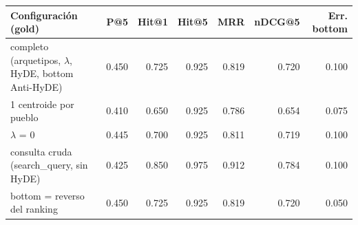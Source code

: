 \begin{tabular}{p{6.4cm}rrrrrr}
\toprule
Configuración (gold) & P@5 & Hit@1 & Hit@5 & MRR & nDCG@5 & Err. bottom \\
\midrule
completo (arquetipos, $\lambda$, HyDE, bottom Anti-HyDE) & 0.450 & 0.725 & 0.925 & 0.819 & 0.720 & 0.100 \\
1 centroide por pueblo & 0.410 & 0.650 & 0.925 & 0.786 & 0.654 & 0.075 \\
$\lambda$ = 0 & 0.445 & 0.700 & 0.925 & 0.811 & 0.719 & 0.100 \\
consulta cruda (search\_query, sin HyDE) & 0.425 & 0.850 & 0.975 & 0.912 & 0.784 & 0.100 \\
bottom = reverso del ranking & 0.450 & 0.725 & 0.925 & 0.819 & 0.720 & 0.050 \\
\bottomrule
\end{tabular}
